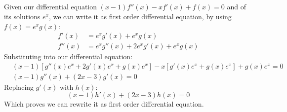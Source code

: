 \documentclass[12pt]{article}
\begin{document}
\subsection{}
Given our differential equation $(x-1)f''(x) - xf'(x) + f(x) = 0$ and of its solutions $e^x$, we can write it as first order differential equation, by using $f(x) = e^xg(x)$:
\begin{equation}
    \begin{split}
        f'(x) &= e^xg'(x) + e^xg(x)\\
        f''(x) &= e^xg''(x) + 2e^xg'(x) + e^xg(x)
    \end{split}
\end{equation}
Substituting into our differential equation:
\begin{equation}
\begin{split}
    &(x-1)\left[g''(x)e^x + 2g'(x)e^x + g(x)e^x\right] - x\left[g'(x)e^x+g(x)e^x\right] + g(x)e^x = 0\\
    &(x-1)g''(x) + (2x-3)g'(x) = 0
\end{split}
\end{equation}
Replacing $g'(x)$ with $h(x)$:
\begin{equation}
    (x-1)h'(x) + (2x-3)h(x) = 0
\end{equation}
Which proves we can rewrite it as first order differential equation.
\end{document}
